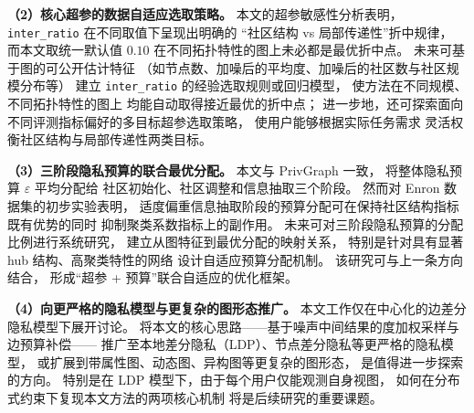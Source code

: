 \par \textbf{（2）核心超参的数据自适应选取策略。}
本文的超参敏感性分析表明，
\texttt{inter\_ratio} 在不同取值下呈现出明确的
``社区结构 vs 局部传递性''折中规律，
而本文取统一默认值 $0.10$ 在不同拓扑特性的图上未必都是最优折中点。
未来可基于图的可公开估计特征
（如节点数、加噪后的平均度、加噪后的社区数与社区规模分布等）
建立 \texttt{inter\_ratio} 的经验选取规则或回归模型，
使方法在不同规模、不同拓扑特性的图上
均能自动取得接近最优的折中点；
进一步地，还可探索面向不同评测指标偏好的多目标超参选取策略，
使用户能够根据实际任务需求
灵活权衡社区结构与局部传递性两类目标。

\par \textbf{（3）三阶段隐私预算的联合最优分配。}
本文与 PrivGraph 一致，
将整体隐私预算 $\varepsilon$ 平均分配给
社区初始化、社区调整和信息抽取三个阶段。
然而对 Enron 数据集的初步实验表明，
适度偏重信息抽取阶段的预算分配可在保持社区结构指标既有优势的同时
抑制聚类系数指标上的副作用。
未来可对三阶段隐私预算的分配比例进行系统研究，
建立从图特征到最优分配的映射关系，
特别是针对具有显著 hub 结构、高聚类特性的网络
设计自适应预算分配机制。
该研究可与上一条方向结合，
形成``超参 + 预算''联合自适应的优化框架。

\par \textbf{（4）向更严格的隐私模型与更复杂的图形态推广。}
本文工作仅在中心化的边差分隐私模型下展开讨论。
将本文的核心思路——基于噪声中间结果的度加权采样与边预算补偿——
推广至本地差分隐私（LDP）、节点差分隐私等更严格的隐私模型，
或扩展到带属性图、动态图、异构图等更复杂的图形态，
是值得进一步探索的方向。
特别是在 LDP 模型下，由于每个用户仅能观测自身视图，
如何在分布式约束下复现本文方法的两项核心机制
将是后续研究的重要课题。




